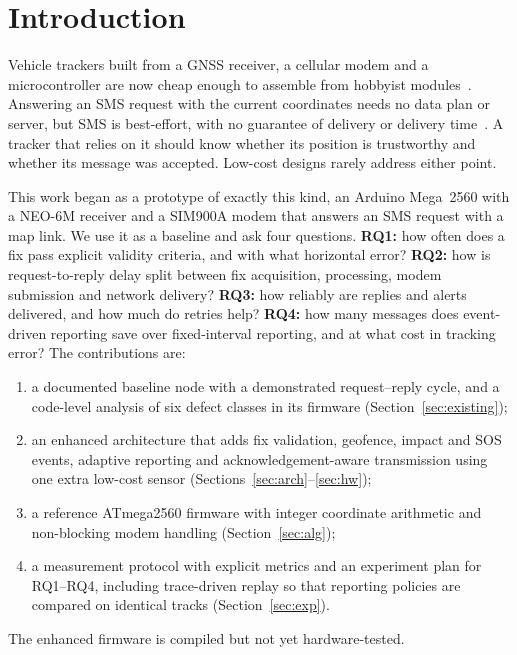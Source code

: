 \documentclass[conference]{IEEEtran}
\begin{document}
\section{Introduction}
Vehicle trackers built from a GNSS receiver, a cellular modem and a microcontroller are now cheap enough to assemble from hobbyist modules~\cite{morallo2021,moumen2023}. Answering an SMS request with the current coordinates needs no data plan or server, but SMS is best-effort, with no guarantee of delivery or delivery time~\cite{pries2006}. A tracker that relies on it should know whether its position is trustworthy and whether its message was accepted. Low-cost designs rarely address either point.

This work began as a prototype of exactly this kind, an Arduino Mega~2560 with a NEO-6M receiver and a SIM900A modem that answers an SMS request with a map link. We use it as a baseline and ask four questions.
\textbf{RQ1:} how often does a fix pass explicit validity criteria, and with what horizontal error? \textbf{RQ2:} how is request-to-reply delay split between fix acquisition, processing, modem submission and network delivery? \textbf{RQ3:} how reliably are replies and alerts delivered, and how much do retries help? \textbf{RQ4:} how many messages does event-driven reporting save over fixed-interval reporting, and at what cost in tracking error?
The contributions are:
\begin{enumerate}
\item a documented baseline node with a demonstrated request--reply cycle, and a code-level analysis of six defect classes in its firmware (Section~\ref{sec:existing});
\item an enhanced architecture that adds fix validation, geofence, impact and SOS events, adaptive reporting and acknowledgement-aware transmission using one extra low-cost sensor (Sections~\ref{sec:arch}--\ref{sec:hw});
\item a reference ATmega2560 firmware with integer coordinate arithmetic and non-blocking modem handling (Section~\ref{sec:alg});
\item a measurement protocol with explicit metrics and an experiment plan for RQ1--RQ4, including trace-driven replay so that reporting policies are compared on identical tracks (Section~\ref{sec:exp}).
\end{enumerate}
The enhanced firmware is compiled but not yet hardware-tested.

\end{document}
